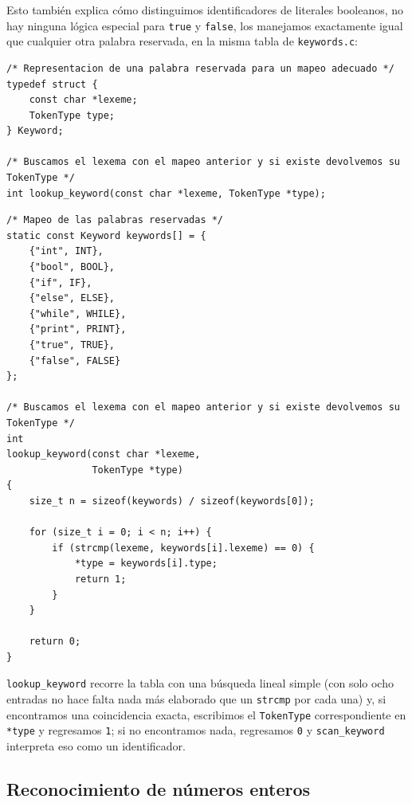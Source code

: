 \documentclass[12pt,letterpaper]{article}
\begin{document}
Esto también explica cómo distinguimos identificadores de literales booleanos, no hay ninguna lógica especial
para \texttt{true} y \texttt{false}, los manejamos exactamente igual que cualquier otra palabra reservada, en la
misma tabla de \texttt{keywords.c}:

\begin{lstlisting}[style=modernc, caption={Módulo \texttt{keywords.h}: representación de una palabra reservada.}]
/* Representacion de una palabra reservada para un mapeo adecuado */
typedef struct {
    const char *lexeme;
    TokenType type;
} Keyword;

/* Buscamos el lexema con el mapeo anterior y si existe devolvemos su TokenType */
int lookup_keyword(const char *lexeme, TokenType *type);
\end{lstlisting}

\bigskip

\begin{lstlisting}[style=modernc, caption={Módulo \texttt{keywords.c}: tabla de palabras reservadas y \texttt{lookup\_keyword}.}]
/* Mapeo de las palabras reservadas */
static const Keyword keywords[] = {
    {"int", INT},
    {"bool", BOOL},
    {"if", IF},
    {"else", ELSE},
    {"while", WHILE},
    {"print", PRINT},
    {"true", TRUE},
    {"false", FALSE}
};

/* Buscamos el lexema con el mapeo anterior y si existe devolvemos su TokenType */
int
lookup_keyword(const char *lexeme,
               TokenType *type)
{
    size_t n = sizeof(keywords) / sizeof(keywords[0]);

    for (size_t i = 0; i < n; i++) {
        if (strcmp(lexeme, keywords[i].lexeme) == 0) {
            *type = keywords[i].type;
            return 1;
        }
    }
    
    return 0;
}
\end{lstlisting}

\bigskip

\texttt{lookup\_keyword} recorre la tabla con una búsqueda lineal simple (con solo ocho entradas no hace
falta nada más elaborado que un \texttt{strcmp} por cada una) y, si encontramos una coincidencia exacta,
escribimos el \texttt{TokenType} correspondiente en \texttt{*type} y regresamos \texttt{1}; si no encontramos
nada, regresamos \texttt{0} y \texttt{scan\_keyword} interpreta eso como un identificador.

\subsection*{Reconocimiento de números enteros}
\end{document}
